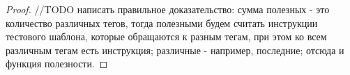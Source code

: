\documentclass[14pt]{extreport}
\newtheorem*{sld}{Следствие}
\newcommand{\LRU}{\textsf{LRU}\xspace}
\begin{document}
\begin{proof}
//TODO написать правильное доказательство:
сумма полезных - это количество различных тегов, тогда полезными будем считать инструкции тестового шаблона, которые обращаются к разным тегам, при этом ко всем различным тегам есть инструкция; различные - например, последние; отсюда и функция полезности.

\end{proof}
\end{document}
